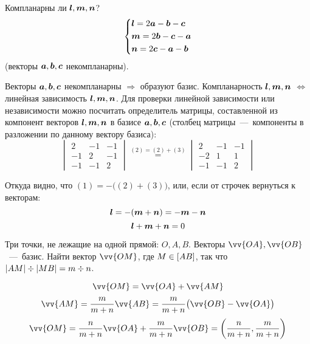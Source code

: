 \documentclass[a4paper,12pt]{article}
\begin{document}
  \begin{problem}[1.11(1)]
    Компланарны ли $\boldsymbol l, \boldsymbol m, \boldsymbol n$?
    \[
      \left\{
        \begin{aligned}
          &\boldsymbol l = 2 \boldsymbol a - \boldsymbol b - \boldsymbol c\\
          &\boldsymbol m = 2 \boldsymbol b - \boldsymbol c - \boldsymbol a\\
          &\boldsymbol n = 2 \boldsymbol c - \boldsymbol a - \boldsymbol b
        \end{aligned}
      \right.
    \]
    (векторы $\boldsymbol a, \boldsymbol b, \boldsymbol c$ некомпланарны).
  \end{problem}
  
  \begin{solution}
    Векторы $\boldsymbol a, \boldsymbol b, \boldsymbol c$ некомпланарны $\Rightarrow$ образуют базис.
    Компланарность $\boldsymbol l, \boldsymbol m, \boldsymbol n$ $\Leftrightarrow$
    линейная зависимость $\boldsymbol l, \boldsymbol m, \boldsymbol n$.
    Для проверки линейной зависимости или независимости можно посчитать определитель матрицы, составленной из компонент векторов $\boldsymbol l, \boldsymbol m, \boldsymbol n$ в базисе $\boldsymbol a, \boldsymbol b, \boldsymbol c$ (столбец матрицы~---~компоненты в разложении по данному вектору базиса):
    \[
      \begin{vmatrix}
        2 & -1 & -1\\
        -1 & 2 & -1\\
        -1 & -1 & 2
      \end{vmatrix}
      \stackrel{(2) = (2) + (3)}{=} \begin{vmatrix}
        2 & -1 & -1\\
        -2 & 1 & 1\\
        -1 & -1 & 2
      \end{vmatrix}
    \]
    
    Откуда видно, что $(1) = -\bigl((2) + (3)\bigr)$, или, если от строчек вернуться к векторам:
    \[
      \boldsymbol l = -(\boldsymbol m + \boldsymbol n) = -\boldsymbol m - \boldsymbol n
    \]
    \[
      \boldsymbol l + \boldsymbol m + \boldsymbol n = 0
    \]
  \end{solution}
  
  
  \begin{problem}[1.24(1)]
    Три точки, не лежащие на одной прямой: $O, A, B$.
    Векторы $\vv{OA}, \vv{OB}$~---~базис.
    Найти вектор $\vv{OM}$, где $M \hm\in [AB]$, так что $|AM| \hm\div |MB| \hm= m \hm\div n$.
  \end{problem}
  
  \begin{solution}
    \[
      \vv{OM} = \vv{OA} + \vv{AM}
    \]
    \[
      \vv{AM} = \frac{m}{m + n} \vv{AB} = \frac{m}{m + n} \bigl(\vv{OB} - \vv{OA} \bigr)
    \]
    \[
      \vv{OM} = \frac{n}{m + n} \vv{OA} + \frac{m}{m + n} \vv{OB} = \left(\frac{n}{m + n}, \frac{m}{m + n}\right)
    \]
  \end{solution}
  
\end{document}

